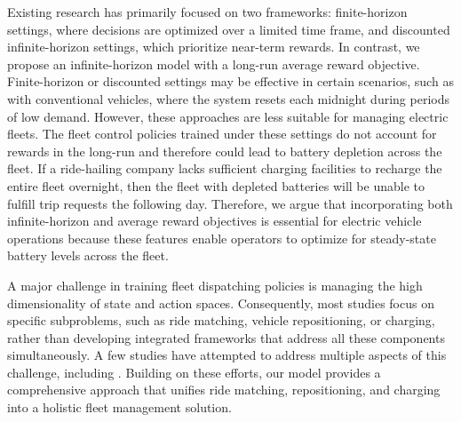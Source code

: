 Existing research has primarily focused on two frameworks: finite-horizon settings, where decisions are optimized over a limited time frame, and discounted infinite-horizon settings, which prioritize near-term rewards. In contrast, we propose an infinite-horizon model with a long-run average reward objective. Finite-horizon or discounted settings may be effective in certain scenarios, such as with conventional vehicles, where the system resets each midnight during periods of low demand. However, these approaches are less suitable for managing electric fleets. The fleet control policies trained under these settings do not account for rewards in the long-run and therefore could lead to battery depletion across the fleet. If a ride-hailing company lacks sufficient charging facilities to recharge the entire fleet overnight, then the fleet with depleted batteries will be unable to fulfill trip requests the following day. Therefore, we argue that incorporating both infinite-horizon and average reward objectives is essential for electric vehicle operations because these features enable operators to optimize for steady-state battery levels across the fleet. 

A major challenge in training fleet dispatching policies is managing the high dimensionality of state and action spaces. Consequently, most studies focus on specific subproblems, such as ride matching, vehicle repositioning, or charging, rather than developing integrated frameworks that address all these components simultaneously. A few studies have attempted to address multiple aspects of this challenge, including \cite{zhu2023dynamic, al2020approximate, wang2022multi, kullman2022, turan2020dynamic}. Building on these efforts, our model provides a comprehensive approach that unifies ride matching, repositioning, and charging into a holistic fleet management solution.

